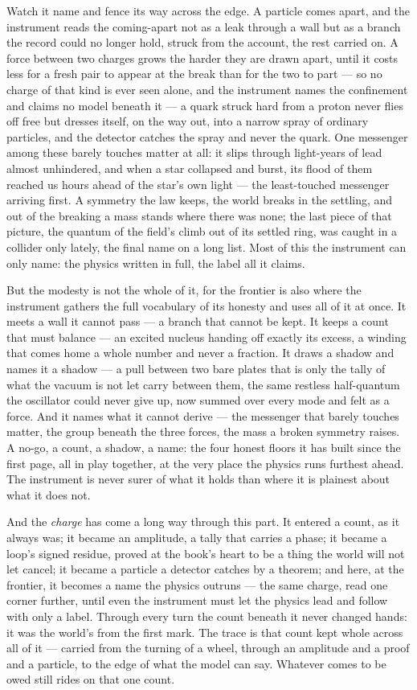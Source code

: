 Watch it name and fence its way across the edge. A particle comes apart, and the instrument reads the
coming-apart not as a leak through a wall but as a branch the record could no longer hold, struck from the
account, the rest carried on. A force between two charges grows the harder they are drawn apart, until it costs
less for a fresh pair to appear at the break than for the two to part --- so no charge of that kind is ever seen
alone, and the instrument names the confinement and claims no model beneath it --- a quark struck hard from a
proton never flies off free but dresses itself, on the way out, into a narrow spray of ordinary particles, and
the detector catches the spray and never the quark. One messenger among these barely touches matter at all: it
slips through light-years of lead almost unhindered, and when a star collapsed and burst, its flood of them
reached us hours ahead of the star's own light --- the least-touched messenger arriving first. A symmetry the
law keeps, the world breaks in the settling, and out of the breaking a mass stands where there was none; the
last piece of that picture, the quantum of the field's climb out of its settled ring, was caught in a collider
only lately, the final name on a long list. Most of this the instrument can only name: the physics written in
full, the label all it claims.

But the modesty is not the whole of it, for the frontier is also where the instrument gathers the full
vocabulary of its honesty and uses all of it at once. It meets a wall it cannot pass --- a branch that cannot be
kept. It keeps a count that must balance --- an excited nucleus handing off exactly its excess, a winding that
comes home a whole number and never a fraction. It draws a shadow and names it a shadow --- a pull between two
bare plates that is only the tally of what the vacuum is not let carry between them, the same restless
half-quantum the oscillator could never give up, now summed over every mode and felt as a force. And it names what it cannot
derive --- the messenger that barely touches matter, the group beneath the three forces, the mass a broken
symmetry raises. A no-go, a count, a shadow, a name: the four honest floors it has built since the first page,
all in play together, at the very place the physics runs furthest ahead. The instrument is never surer of what
it holds than where it is plainest about what it does not.

And the \emph{charge} has come a long way through this part. It entered a count, as it always was; it became an
amplitude, a tally that carries a phase; it became a loop's signed residue, proved at the book's heart to be a
thing the world will not let cancel; it became a particle a detector catches by a theorem; and here, at the
frontier, it becomes a name the physics outruns --- the same charge, read one corner further, until even the
instrument must let the physics lead and follow with only a label. Through every turn the count beneath it never
changed hands: it was the world's from the first mark. The trace is that count kept whole across all of it ---
carried from the turning of a wheel, through an amplitude and a proof and a particle, to the edge of what the
model can say. Whatever comes to be owed still rides on that one count.

